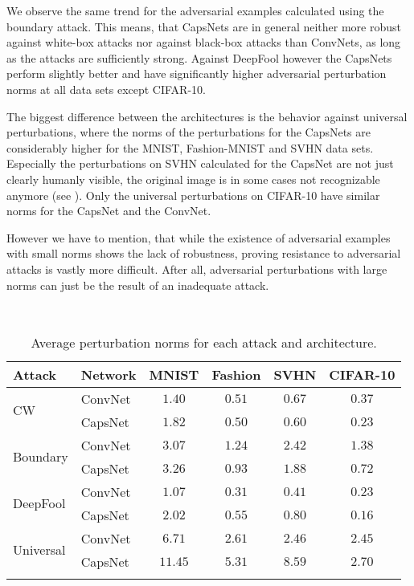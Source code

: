 We observe the same trend for the adversarial examples calculated using the boundary attack.
This means, that CapsNets are in general neither more robust against white-box attacks nor against black-box attacks than ConvNets, as long as the attacks are sufficiently strong.
Against DeepFool however the CapsNets perform slightly better and have significantly higher adversarial perturbation norms at all data sets except CIFAR-10.

The biggest difference between the architectures is the behavior against universal perturbations, where the norms of the perturbations for the CapsNets are considerably higher for the MNIST, Fashion-MNIST and SVHN data sets. Especially the perturbations on SVHN calculated for the CapsNet are not just clearly humanly visible, the original image is in some cases not recognizable anymore (see ).
Only the universal perturbations on CIFAR-10 have similar norms for the CapsNet and the ConvNet.

However we have to mention, that while the existence of adversarial examples with small norms shows the lack of robustness, proving resistance to adversarial attacks is vastly more difficult.
After all, adversarial perturbations with large norms can just be the result of an inadequate attack.

\begin{table}
	\centering\
	\begin{tabular}{llcccc}
		\toprule
		Attack & Network       & MNIST & Fashion & SVHN & CIFAR-10  \\
		\midrule
		\multirow{2}{*}{CW} & ConvNet & {$1.40$} & $0.51$ & $0.67$ & $0.37$ \\
		& CapsNet            & $1.82$ & {$0.50$} & {$0.60$} & {$0.23$} \\
		\midrule
		\multirow{2}{*}{Boundary} & ConvNet & {$3.07$} & $1.24$ & $2.42$ & $1.38$ \\
		& CapsNet            & $3.26$ & {$0.93$} & {$1.88$} & {$0.72$} \\
		\midrule
		\multirow{2}{*}{DeepFool} & ConvNet & {$1.07$} & {$0.31$} & {$0.41$} & $0.23$ \\
		& CapsNet           & $2.02$ & $0.55$ & $0.80$ & {$0.16$} \\
		\midrule
		\multirow{2}{*}{Universal} & ConvNet & {$6.71$} & {$2.61$} & {$2.46$} & {$2.45$} \\
		& CapsNet           & $11.45$ & $5.31$ & $8.59$ & $2.70$ \\
		\bottomrule\\
	\end{tabular}
	\caption[Average Perturbation Norms]{Average perturbation norms for each attack and architecture.}
	\label{tab:norms}
\end{table}

